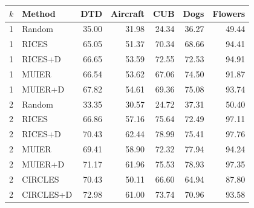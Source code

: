 \begin{tabular}{llrrrrr}
\toprule
$k$ & Method & DTD & Aircraft & CUB & Dogs & Flowers \\
\midrule
1 & Random & 35.00 & 31.98 & 24.34 & 36.27 & 49.44 \\
1 & RICES & 65.05 & 51.37 & 70.34 & 68.66 & 94.41 \\
1 & RICES+D & 66.65 & 53.59 & 72.55 & 72.53 & 94.91 \\
1 & MUIER & 66.54 & 53.62 & 67.06 & 74.50 & 91.87 \\
1 & MUIER+D & 67.82 & 54.61 & 69.36 & 75.08 & 93.74 \\
2 & Random & 33.35 & 30.57 & 24.72 & 37.31 & 50.40 \\
2 & RICES & 66.86 & 57.16 & 75.64 & 72.49 & 97.11 \\
2 & RICES+D & 70.43 & 62.44 & 78.99 & 75.41 & 97.76 \\
2 & MUIER & 69.41 & 58.90 & 72.32 & 77.94 & 94.24 \\
2 & MUIER+D & 71.17 & 61.96 & 75.53 & 78.93 & 97.35 \\
2 & CIRCLES & 70.43 & 50.11 & 66.60 & 64.94 & 87.80 \\
2 & CIRCLES+D & 72.98 & 61.00 & 73.74 & 70.96 & 93.58 \\
\bottomrule
\end{tabular}
